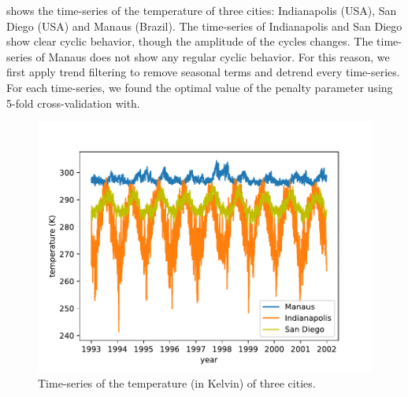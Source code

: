 \documentclass[letterpaper]{article} %
\newcommand{\autoref}{\Cref}
\begin{document}
\autoref{fig:cities_ts} shows the time-series of the 
temperature of three cities: Indianapolis (USA), San Diego (USA) and
Manaus (Brazil). The time-series of Indianapolis and San Diego show
clear cyclic behavior, though the amplitude of the cycles
changes. The time-series of Manaus does not
show any regular cyclic behavior. For this reason, we
first apply trend filtering to remove seasonal terms and detrend
every time-series. For each time-series, we found the optimal value of
the penalty parameter using 5-fold cross-validation with.
\begin{figure}[tb]
	\centering
	\includegraphics[width=.66\columnwidth]{Figures/cities_ts}
 	\caption{Time-series of the temperature (in Kelvin) of three cities.}
 	\label{fig:cities_ts}
\end{figure} 
\end{document}

